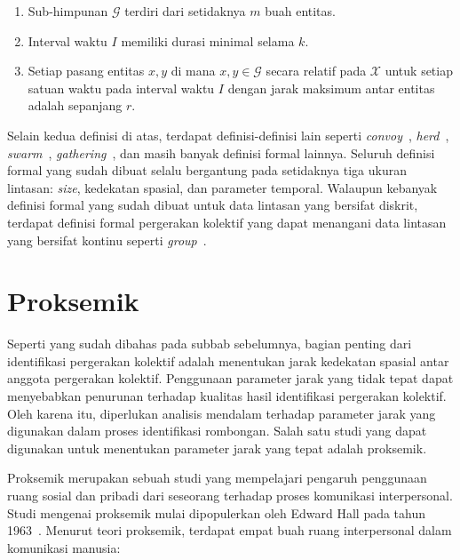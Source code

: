\begin{itemize}
    \begin{enumerate}
        \item Sub-himpunan $\mathcal{G}$ terdiri dari setidaknya $m$ buah entitas.
        \item Interval waktu $I$ memiliki durasi minimal selama $k$.
        \item Setiap pasang entitas $x, y$ di mana $x, y \in \mathcal{G}$ secara relatif pada $\mathcal{X}$ untuk setiap satuan waktu pada interval waktu $I$ dengan jarak maksimum antar entitas adalah sepanjang $r$.
    \end{enumerate}
\end{itemize}

Selain kedua definisi di atas, terdapat definisi-definisi lain seperti \textit{convoy}~\cite{jeung:convoys}, \textit{herd}~\cite{huang:02:herd}, \textit{swarm}~\cite{li:swarm}, \textit{gathering}~\cite{zheng:02:gatherings}, dan masih banyak definisi formal lainnya. Seluruh definisi formal yang sudah dibuat selalu bergantung pada setidaknya tiga ukuran lintasan: \textit{size}, kedekatan spasial, dan parameter temporal. Walaupun kebanyak definisi formal yang sudah dibuat untuk data lintasan yang bersifat diskrit, terdapat definisi formal pergerakan kolektif yang dapat menangani data lintasan yang bersifat kontinu seperti \textit{group}~\cite{buchin:group}.

\section{Proksemik}
\label{sec:proxemic}

Seperti yang sudah dibahas pada subbab sebelumnya, bagian penting dari identifikasi pergerakan kolektif adalah menentukan jarak kedekatan spasial antar anggota pergerakan kolektif. Penggunaan parameter jarak yang tidak tepat dapat menyebabkan penurunan terhadap kualitas hasil identifikasi pergerakan kolektif. Oleh karena itu, diperlukan analisis mendalam terhadap parameter jarak yang digunakan dalam proses identifikasi rombongan. Salah satu studi yang dapat digunakan untuk menentukan parameter jarak yang tepat adalah proksemik.

Proksemik merupakan sebuah studi yang mempelajari pengaruh penggunaan ruang sosial dan pribadi dari seseorang terhadap proses komunikasi interpersonal. Studi mengenai proksemik mulai dipopulerkan oleh Edward Hall pada tahun 1963~\cite{hall:06:proxemic}. Menurut teori proksemik, terdapat empat buah ruang interpersonal dalam komunikasi manusia:

